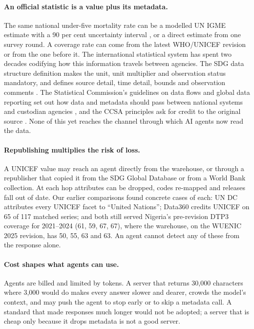 \documentclass[11pt,a4paper]{article}
\begin{document}
\paragraph{An official statistic is a value plus its metadata.} The same national under-five mortality rate can be a modelled UN IGME estimate with a 90 per cent uncertainty interval \citep{igme2025}, or a direct estimate from one survey round. A coverage rate can come from the latest WHO/UNICEF revision or from the one before it. The international statistical system has spent two decades codifying how this information travels between agencies. The SDG data structure definition makes the unit, unit multiplier and observation status mandatory, and defines source detail, time detail, bounds and observation comments \citep{unsd2019}. The Statistical Commission's guidelines on data flows and global data reporting set out how data and metadata should pass between national systems and custodian agencies \citep{unsc2018}, and the CCSA principles ask for credit to the original source \citep{ccsa2016}. None of this yet reaches the channel through which AI agents now read the data.

\paragraph{Republishing multiplies the risk of loss.} A UNICEF value may reach an agent directly from the warehouse, or through a republisher that copied it from the SDG Global Database or from a World Bank collection. At each hop attributes can be dropped, codes re-mapped and releases fall out of date. Our earlier comparisons found concrete cases of each: UN DC attributes every UNICEF facet to ``United Nations''; Data360 credits UNICEF on 65 of 117 matched series; and both still served Nigeria's pre-revision DTP3 coverage for 2021--2024 (61, 59, 67, 67), where the warehouse, on the WUENIC 2025 revision, has 50, 55, 63 and 63. An agent cannot detect any of these from the response alone.

\paragraph{Cost shapes what agents can use.} Agents are billed and limited by tokens. A server that returns 30,000 characters where 3,000 would do makes every answer slower and dearer, crowds the model's context, and may push the agent to stop early or to skip a metadata call. A standard that made responses much longer would not be adopted; a server that is cheap only because it drops metadata is not a good server.
\end{document}
